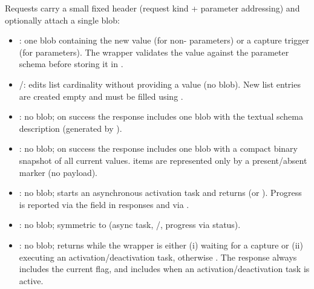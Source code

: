 Requests carry a small fixed header (request kind + parameter addressing) and optionally attach a single blob:
\begin{itemize}
    \item {}: one blob containing the new value (for non- parameters) or a capture trigger (for  parameters). The wrapper validates the value against the parameter schema before storing it in .
    \item {}/: edits list cardinality without providing a value (no blob). New list entries are created empty and must be filled using .
    \item {}: no blob; on success the response includes one blob with the textual schema description (generated by ).
    \item {}: no blob; on success the response includes one blob with a compact binary snapshot of all current values.  items are represented only by a present/absent marker (no payload).
    \item {}: no blob; starts an asynchronous activation task and returns  (or ). Progress is reported via the  field in responses and via .
    \item {}: no blob; symmetric to  (async task, /, progress via status).
    \item {}: no blob; returns  while the wrapper is either (i) waiting for a  capture or (ii) executing an activation/deactivation task, otherwise . The response always includes the current  flag, and includes  when an activation/deactivation task is active. 
    

\end{itemize}
